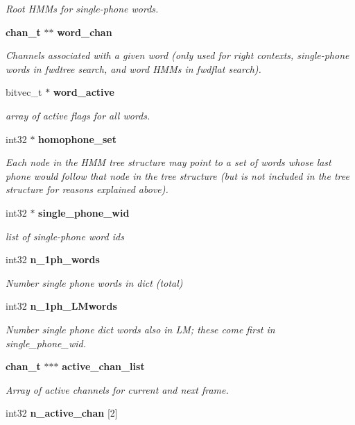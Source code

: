 \begin{DoxyCompactItemize}
\begin{DoxyCompactList}\small\item\em Root H\-M\-Ms for single-\/phone words. \end{DoxyCompactList}\item 
{\bf chan\-\_\-t} $\ast$$\ast$ {\bf word\-\_\-chan}
\begin{DoxyCompactList}\small\item\em Channels associated with a given word (only used for right contexts, single-\/phone words in fwdtree search, and word H\-M\-Ms in fwdflat search). \end{DoxyCompactList}\item 
bitvec\-\_\-t $\ast$ {\bf word\-\_\-active}
\begin{DoxyCompactList}\small\item\em array of active flags for all words. \end{DoxyCompactList}\item 
int32 $\ast$ {\bf homophone\-\_\-set}
\begin{DoxyCompactList}\small\item\em Each node in the H\-M\-M tree structure may point to a set of words whose last phone would follow that node in the tree structure (but is not included in the tree structure for reasons explained above). \end{DoxyCompactList}\item 
int32 $\ast$ {\bf single\-\_\-phone\-\_\-wid}\label{structngram__search__s_a1157923e0060b947e05caa819c8abe2c}

\begin{DoxyCompactList}\small\item\em list of single-\/phone word ids \end{DoxyCompactList}\item 
int32 {\bf n\-\_\-1ph\-\_\-words}\label{structngram__search__s_a9168184c862d6f63bd7926e6581b25d9}

\begin{DoxyCompactList}\small\item\em Number single phone words in dict (total) \end{DoxyCompactList}\item 
int32 {\bf n\-\_\-1ph\-\_\-\-L\-Mwords}\label{structngram__search__s_a988672d895f1ee61dbf790b2065df4df}

\begin{DoxyCompactList}\small\item\em Number single phone dict words also in L\-M; these come first in single\-\_\-phone\-\_\-wid. \end{DoxyCompactList}\item 
{\bf chan\-\_\-t} $\ast$$\ast$$\ast$ {\bf active\-\_\-chan\-\_\-list}
\begin{DoxyCompactList}\small\item\em Array of active channels for current and next frame. \end{DoxyCompactList}\item 
int32 {\bf n\-\_\-active\-\_\-chan} [2]\label{structngram__search__s_ac33f60894871671ec5c2173ca56d600f}


\end{DoxyCompactItemize}
